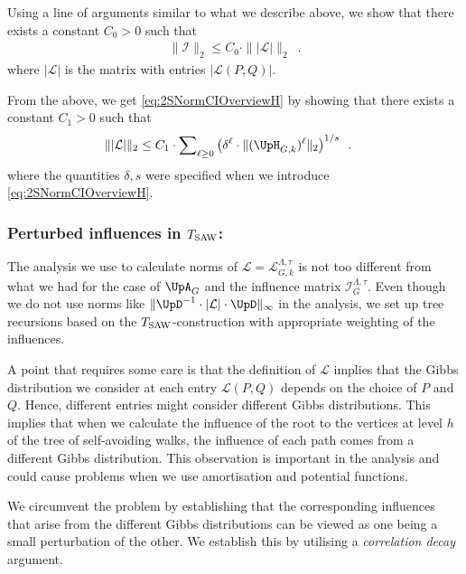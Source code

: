 \documentclass[11pt,reqno]{amsart}
\numberwithin{equation}{section}
\newcommand{\cI}{{\mathcal{I}}}
\newcommand{\cL}{{\mathcal{L}}}
\newcommand{\applegreen}[1]{ {\color{applegreen}#1}}
\newcommand{\amethyst}[1]{{\color{amethyst}#1} }
\newcommand{\blue}[1]{{\color{blue}#1}}
\newcommand{\bluepigment}[1]{{\color{blue(pigment)}#1}}
\newcommand{\cadmiumgreen}[1]{{\color{cadmiumgreen}#1}}
\newcommand{\cadmiumorange}[1]{{\color{cadmiumorange}#1}}
\newcommand{\darkmagenta}[1]{{\color{darkmagenta}#1}}
\newcommand{\goldenbrown}[1]{{\color{goldenbrown}#1}}
\newcommand{\rosegold}[1]{{\color{rosegold}#1}}
\newcommand{\pfs}{\darkmagenta{s}}
\newcommand{\Tsaw}{T_{\rm SAW}}
\newcommand{\infmatrix}{\cI}
\newcommand{\norm}[2]{\goldenbrown{\|} #1 \goldenbrown{\|}_{#2}}
\newcommand{\abs}[1]{\blue{|}#1\blue{|}}
\newcommand{\Adjacency}{{\UpA}}
\newcommand{\NBMatrix}{\cadmiumgreen{\UpH}_{G,\kk}}
\renewcommand{\applegreen}[1]{#1}
\renewcommand{\amethyst}[1]{#1}
\renewcommand{\blue}[1]{#1}
\renewcommand{\bluepigment}[1]{#1}
\renewcommand{\cadmiumgreen}[1]{#1}
\renewcommand{\cadmiumorange}[1]{#1}
\renewcommand{\darkmagenta}[1]{#1}
\renewcommand{\goldenbrown}[1]{#1}
\renewcommand{\rosegold}[1]{#1}
\newcommand{\kh}{\cadmiumorange{h}}
\newcommand{\kk}{\bluepigment{k}}
\newcommand{\kell}{{\color{green(pigment)}\ell}}%
\newcommand{\kP}{\goldenbrown{P}}
\newcommand{\kQ}{\amethyst{Q}}
\renewcommand{\kh}{h}
\renewcommand{\kk}{k}
\renewcommand{\kell}{\ell}
\renewcommand{\kP}{P}
\renewcommand{\kQ}{Q}
\newcommand{\ExtdInfMatrix}{\rosegold{\cL}}
\newcommand{\ExtdInfMatrixF}{\applegreen{\cL}^{\Lambda,\tau}_{G,\kk}}
\begin{document}
Using a line of arguments similar to what we describe  above, we   show that there exists a constant $C_0>0$ such that 
\begin{align}\nonumber
\norm{ \infmatrix}{2}  \leq C_0 \cdot \norm{\abs{\ExtdInfMatrix}}{2} \enspace.
\end{align}
where $\abs{\ExtdInfMatrix}$ is the matrix with entries $\abs{\ExtdInfMatrix(\kP,\kQ)}$. 

From the above, we get \eqref{eq:2SNormCIOverviewH} by showing that  there exists a constant $C_1>0$
such that
\begin{align}\nonumber
\norm{\abs{\ExtdInfMatrix}}{2} &\leq C_1\cdot \sum\nolimits_{\kell\geq 0} \left( \delta^{\kell}
\cdot \norm{( \NBMatrix)^{\kell}}{2} \right)^{1/\pfs}\enspace.
\end{align}
where the quantities $\delta,\pfs$ were specified when we introduce \eqref{eq:2SNormCIOverviewH}.

\subsubsection*{Perturbed influences in $\Tsaw$:}
The analysis we use to calculate norms of $\ExtdInfMatrix=\ExtdInfMatrixF$ is not too different from what we had 
for the case of $\Adjacency_G$ and the influence matrix $\infmatrix^{\Lambda,\tau}_G$. 
Even though we do not use norms like $\norm{\UpD^{-1} \cdot \abs{\ExtdInfMatrix}\cdot \UpD}{\infty}$ in the analysis, 
we set up tree 
recursions based on the $\Tsaw$-construction with appropriate weighting of the influences. 


A point that requires some care is that the definition of $\ExtdInfMatrix$ implies that  the Gibbs distribution we 
consider at each entry  $\ExtdInfMatrix(\kP,\kQ)$ depends on the choice of $\kP$ and $\kQ$. Hence, different 
entries might consider different Gibbs distributions.  This implies that when we calculate the influence of the root 
to the vertices at  level $\kh$ of the tree of self-avoiding walks, the influence of each path comes from a different 
Gibbs distribution.  This observation is   important in the analysis and could cause problems when  we use amortisation 
 and potential  functions.  

We circumvent the problem by establishing that the corresponding influences that arise from the different Gibbs
distributions can be viewed as one being a small perturbation of the  other. We establish this by utilising a  {\em correlation decay} 
argument. 
\end{document}
